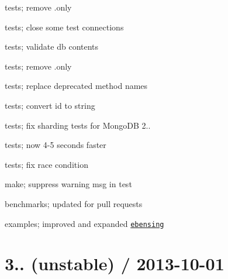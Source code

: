 \begin{DoxyItemize}
\item tests; remove .only
\item tests; close some test connections
\item tests; validate db contents
\item tests; remove .only
\item tests; replace deprecated method names
\item tests; convert id to string
\item tests; fix sharding tests for Mongo\+DB 2..
\item tests; now 4-\/5 seconds faster
\item tests; fix race condition
\item make; suppress warning msg in test
\item benchmarks; updated for pull requests
\item examples; improved and expanded \href{https://github.com/ebensing}{\tt ebensing}
\end{DoxyItemize}

\section*{3.. (unstable) / 2013-\/10-\/01 }


